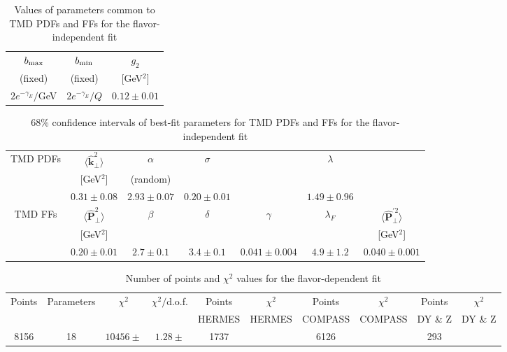\documentclass[aps,preprintnumbers,showpacs,nofootinbib,superscriptaddress,floatfix]{revtex4}
\newcommand{\T}{\perp}
\begin{document}
\begin{table}
\small
  \centering
  \begin{tabular}{|c|c|c|}
\hline
\hline
$b_{\rm max}$ & $b_{\rm min}$ &  $g_2$ 
 \\ 
 (fixed)     & (fixed)   & {[GeV$^2$]}                           \\
\hline
$2 e^{-\gamma_E}/$GeV& $2 e^{-\gamma_E}/Q$  & $0.12 \pm 0.01$  \\
\hline
\hline
\end{tabular}
\caption{Values of parameters common to TMD PDFs and FFs 
for the flavor-independent fit}
\label{t:parcommon}
\end{table}

\begin{table}
\small
  \centering
  \begin{tabular}{|c||c|c|c|c|c|c|}
\hline
\hline
TMD PDFs&  $\big \langle \hat{\bm{k}}_{\T}^2 \big \rangle$ 
& $\alpha$ & $\sigma$ & & $\lambda$ &  
 \\ 
        & {[GeV$^2$]}                               &
      (random) &      &  & & \\
\hline
  & $0.31 \pm 0.08$ & $2.93 \pm 0.07 $ & $0.20 \pm
0.01$  &  & $1.49 \pm 0.96$ &    \\
\hline
\hline
TMD FFs&  $\big \langle \hat{\bm{P}}_{\perp}^2 \big \rangle$ &
$\beta$ & $\delta$ & $\gamma$ & $\lambda_F$ & $\big \langle
\hat{\bm{P}}_{\perp}^{\prime 2} \big \rangle$
 \\ 
        & {[GeV$^2$]} &            &         & & &{[GeV$^2$]}    \\
\hline
   &  $0.20 \pm 0.01$ & $2.7 \pm 0.1 $ & $3.4
\pm 0.1$ & $0.041 \pm 0.004$ & $4.9 \pm 1.2$ & $0.040 \pm 0.001$  \\
\hline
\hline
\end{tabular}
\caption{68\% confidence intervals of 
best-fit parameters for TMD PDFs and FFs for the flavor-independent fit}
\label{t:fd_PDFs_par}
\end{table}

\begin{table}[h]
\small
  \centering
  \begin{tabular}{|c|c|c|c|c|c|c|c|c|c|}
\hline
\hline
Points& Parameters & $\chi^2$& $\chi^2/$d.o.f.& 
                  Points &$\chi^2$& Points &$\chi^2$& Points &$\chi^2$ 
 \\ 
      &    &    &  & HERMES    & HERMES   & COMPASS & COMPASS & DY \& Z & DY \& Z  \\
\hline
8156 & 18  & $10456 \pm  $ & $1.28 \pm  $ & 1737&  &6126 & & 293 &    \\
\hline
\hline
\end{tabular}
\caption{Number of points and $\chi^2$ values 
for the flavor-dependent fit}
\label{t:chi2_flav}
\end{table}
\end{document}
